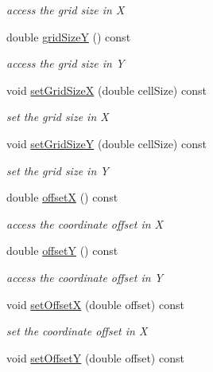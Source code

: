 \begin{DoxyCompactItemize}
\begin{DoxyCompactList}\small\item\em access the grid size in X \end{DoxyCompactList}\item 
double \hyperlink{class_d_d4hep_1_1_geometry_1_1_cartesian_grid_x_y_ab87bec1a942c778eb54fa1fe9b71fc26}{grid\+SizeY} () const
\begin{DoxyCompactList}\small\item\em access the grid size in Y \end{DoxyCompactList}\item 
void \hyperlink{class_d_d4hep_1_1_geometry_1_1_cartesian_grid_x_y_a38a173458549e13152de598c4a2866ba}{set\+Grid\+SizeX} (double cell\+Size) const
\begin{DoxyCompactList}\small\item\em set the grid size in X \end{DoxyCompactList}\item 
void \hyperlink{class_d_d4hep_1_1_geometry_1_1_cartesian_grid_x_y_a1e23de21ba73945930f2ae38a7e25f9f}{set\+Grid\+SizeY} (double cell\+Size) const
\begin{DoxyCompactList}\small\item\em set the grid size in Y \end{DoxyCompactList}\item 
double \hyperlink{class_d_d4hep_1_1_geometry_1_1_cartesian_grid_x_y_a59cd42f0a2ae823737f5b2b54e5224a1}{offsetX} () const
\begin{DoxyCompactList}\small\item\em access the coordinate offset in X \end{DoxyCompactList}\item 
double \hyperlink{class_d_d4hep_1_1_geometry_1_1_cartesian_grid_x_y_a353eae656ad21d92134d280567b91499}{offsetY} () const
\begin{DoxyCompactList}\small\item\em access the coordinate offset in Y \end{DoxyCompactList}\item 
void \hyperlink{class_d_d4hep_1_1_geometry_1_1_cartesian_grid_x_y_afc2c6ca73a3ec619dcd0ed02b5da7320}{set\+OffsetX} (double offset) const
\begin{DoxyCompactList}\small\item\em set the coordinate offset in X \end{DoxyCompactList}\item 
void \hyperlink{class_d_d4hep_1_1_geometry_1_1_cartesian_grid_x_y_a24cf22e1d6707cc54a3484c42d58b283}{set\+OffsetY} (double offset) const

\end{DoxyCompactItemize}
